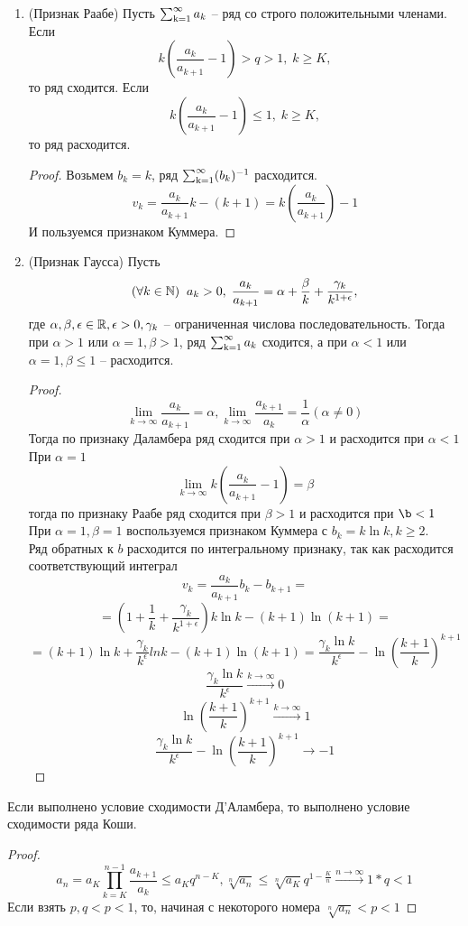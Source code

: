 \begin{enumerate}
\begin{proof}
Итак, $$v_k = \frac{a_k}{a_{k+1}}b_k - b_{k+1} \le 0 \text{ при } k \ge K,$$
т.е. $a_k b_k - a_{k+1}b_{k+1}\le 0$ при $k \ge K$.
Значит, $$ \sum_{k=K}^{n-1} \big( a_k b_k-a_{k+1}b_{k+1} \big) = a_K b_K - a_n b_n \le 0,\; n>K$$
отсюда: $a_N \ge a_Kb_K - (b_n)^{-1}$. Из расходимости ряда $\ssum b_k$ следует расходимость ряда $\ssum a_k$
\end{proof}
\item
(Признак Раабе) Пусть $\ssum a_k$ -- ряд со строго положительными членами.
Если $$k \left( \frac{a_k}{a_{k+1}} -1 \right) > q > 1,\; k \ge K,$$
то ряд сходится.
Если $$k \left( \frac{a_k}{a_{k+1}} -1 \right) \le 1,\; k \ge K,$$
то ряд расходится.
\begin{proof}
Возьмем $b_k =k$, ряд $\operatorname{\sum_{k=1}^{\infty}} (b_k)^{-1}$ расходится.
$$v_k = \frac{a_k}{a_{k+1}}k - (k+1) = k (\frac{a_k}{a_{k+1}}) -1 $$
И пользуемся признаком Куммера.
\end{proof}
\item
(Признак Гаусса) Пусть 
$$(\forall k \in \operatorname{\mathbb{N}}) \;\; a_k>0,\; \frac{a_k}{a_{k+1}} = \alpha + \frac{\beta}{k}+\frac{\gamma_k}{k^{1+\epsilon}}, $$
где $\alpha, \beta, \epsilon \in \operatorname{\mathbb{R}}, \epsilon > 0, \gamma_k$ -- ограниченная числова последовательность.
Тогда при $\alpha > 1$ или $\alpha = 1, \beta > 1$, ряд $\ssum a_k$ сходится, а  при $\alpha < 1$ или $\alpha = 1, \beta \le 1$ -- расходится.
\begin{proof}
$$\lim_{k \to \infty} \frac{a_k}{a_{k+1}} = \alpha, \lim_{k \to \infty} \frac{a_{k+1}}{a_k} = \frac{1}{\alpha} (\alpha \not=0)$$
Тогда по признаку Даламбера ряд сходится при $\alpha > 1$ и расходится при $\alpha < 1$\\
При $\alpha = 1$\\
$$\lim_{k \to \infty} k ( \frac{a_k}{a_{k+1}} -1 ) = \beta $$
тогда по признаку Раабе ряд сходится при $\beta > 1$ и расходится при $\b < 1$\\
При $\alpha =1, \beta =1$ воспользуемся признаком Куммера с $b_k = k \ln k, k\ge 2.$\\
Ряд обратных к $b$ расходится по интегральному признаку, так как расходится соответствующий интеграл
$$v_k = \frac{a_k}{a_{k+1}}b_k - b_{k+1} =$$
$$= \left(1 + \frac{1}{k} + \frac{\gamma_k}{k^{1+\epsilon}} \right) k \ln k - (k+1)\ln(k+1) =$$
$$=(k+1)\ln k + \frac{\gamma_k}{k^{\epsilon}}ln k - (k+1)\ln(k+1) = \frac{\gamma_k \ln k}{k^{\epsilon}} - \ln(\frac{k+1}{k})^{k+1}$$
$$\frac{\gamma_k \ln k}{k^{\epsilon}} \xrightarrow{k \to \infty} 0$$
$$\ln(\frac{k+1}{k})^{k+1} \xrightarrow{k \to \infty} 1$$
$$\frac{\gamma_k \ln k}{k^{\epsilon}} - \ln(\frac{k+1}{k})^{k+1} \to -1 $$
\end{proof}
\end{enumerate}
\newpage	
\begin{thm}
Если выполнено условие сходимости Д'Аламбера, то выполнено условие сходимости ряда Коши.
\end{thm}
\begin{proof}
$$a_n = a_K \prod_{k=K}^{n-1} \frac{a_{k+1}}{a_k} \le a_K q^{n-K}, \sqrt[n]{a_n} \le \sqrt[n]{a_K}q^{1-\frac{K}{n}} \xrightarrow{n \to \infty} 1*q < 1$$
Если взять $p, q<p<1$, то, начиная с некоторого номера $\sqrt[n]{a_n}<p<1$
\end{proof}